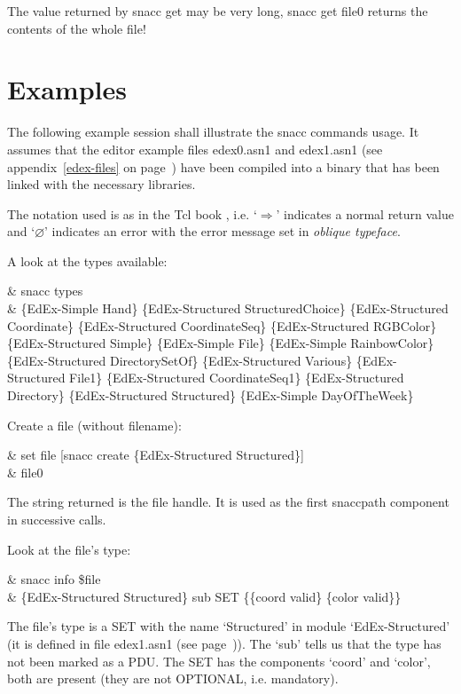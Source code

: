 The value returned by {\Tcl snacc get} may be very long, {\Tcl snacc get file0} returns the contents of the whole file!

\section{\label{snacc-examples}Examples}

The following example session shall illustrate the {\Tcl snacc} commands usage.
It assumes that the editor example files {\ufn edex0.asn1} and {\ufn edex1.asn1} (see appendix~\ref{edex-files} on page~\pageref{edex-files}) have been compiled into a binary that has been linked with the necessary libraries.

The notation used is as in the Tcl book \cite{tcl-book}, i.e. `$\Rightarrow$' indicates a normal return value and `$\varnothing$' indicates an error with the error message set in {\Tcl \emph{oblique typeface}}.

A look at the types available:

\begin{Tclex}
   & snacc types\\
\R & \{EdEx-Simple Hand\} \{EdEx-Structured StructuredChoice\} \{EdEx-Structured Coordinate\} \{EdEx-Structured CoordinateSeq\} \{EdEx-Structured RGBColor\} \{EdEx-Structured Simple\} \{EdEx-Simple File\} \{EdEx-Simple RainbowColor\} \{EdEx-Structured DirectorySetOf\} \{EdEx-Structured Various\} \{EdEx-Structured File1\} \{EdEx-Structured CoordinateSeq1\} \{EdEx-Structured Directory\} \{EdEx-Structured Structured\} \{EdEx-Simple DayOfTheWeek\}
\end{Tclex}

Create a file (without filename):

\begin{Tclex}
   & set file [snacc create \{EdEx-Structured Structured\}]\\
\R & file0
\end{Tclex}

The string returned is the file handle. It is used as the first snaccpath component in successive calls.

Look at the file's type:

\begin{Tclex}
   & snacc info \$file\\
\R & \{EdEx-Structured Structured\} sub SET \{\{coord valid\} \{color valid\}\}
\end{Tclex}

The file's type is a SET with the name `Structured' in module `EdEx-Structured' (it is defined in file {\ufn edex1.asn1} (see page~\pageref{edex1.asn1})).
The `sub' tells us that the type has not been marked as a PDU.
The SET has the components `coord' and `color', both are present (they are not OPTIONAL, i.e. mandatory).

